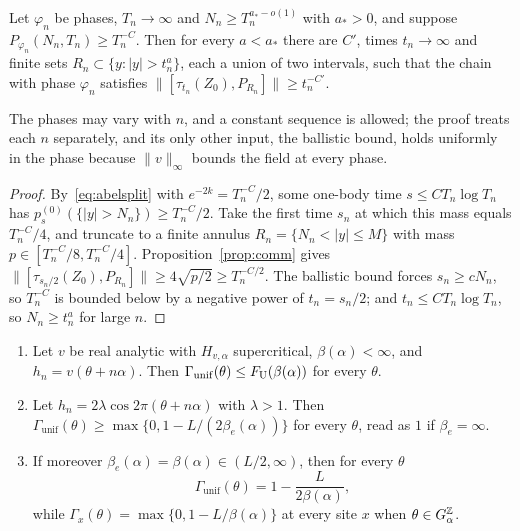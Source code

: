\begin{lemma}\label{lem:tailcomm}
Let $\varphi_n$ be phases, $T_n\to\infty$ and $N_n\ge T_n^{a_*-o(1)}$ with $a_*>0$, and suppose $P_{\varphi_n}(N_n,T_n)\ge T_n^{-C}$. Then for every $a<a_*$ there are $C'$, times $t_n\to\infty$ and finite sets $R_n\subset\{y:|y|>t_n^a\}$, each a union of two intervals, such that the chain with phase $\varphi_n$ satisfies $\|[\tau_{t_n}(Z_0),P_{R_n}]\|\ge t_n^{-C'}$.
\end{lemma}

The phases may vary with $n$, and a constant sequence is allowed; the proof treats each $n$ separately, and its only other input, the ballistic bound, holds uniformly in the phase because $\|v\|_\infty$ bounds the field at every phase.

\begin{proof}
By~\eqref{eq:abelsplit} with $e^{-2k}=T_n^{-C}/2$, some one-body time $s\le CT_n\log T_n$ has $p^{(0)}_s(\{|y|>N_n\})\ge T_n^{-C}/2$. Take the first time $s_n$ at which this mass equals $T_n^{-C}/4$, and truncate to a finite annulus $R_n=\{N_n<|y|\le M\}$ with mass $p\in[T_n^{-C}/8,T_n^{-C}/4]$. Proposition~\ref{prop:comm} gives $\|[\tau_{s_n/2}(Z_0),P_{R_n}]\|\ge4\sqrt{p/2}\ge T_n^{-C/2}$. The ballistic bound forces $s_n\ge cN_n$, so $T_n^{-C}$ is bounded below by a negative power of $t_n=s_n/2$; and $t_n\le CT_n\log T_n$, so $N_n\ge t_n^a$ for large $n$.
\end{proof}

\begin{theorem}\label{thm:LRunif}
\begin{enumerate}
\item Let $v$ be real analytic with $H_{v,\alpha}$ supercritical, $\beta(\alpha)<\infty$, and $h_n=v(\theta+n\alpha)$. Then $\Gamma_{\mathrm{unif}}(\theta)\le F_{\mathrm U}(\beta(\alpha))$ for every $\theta$.
\item Let $h_n=2\lambda\cos2\pi(\theta+n\alpha)$ with $\lambda>1$. Then $\Gamma_{\mathrm{unif}}(\theta)\ge\max\{0,1-L/(2\beta_e(\alpha))\}$ for every $\theta$, read as $1$ if $\beta_e=\infty$.
\item If moreover $\beta_e(\alpha)=\beta(\alpha)\in(L/2,\infty)$, then for every $\theta$
\[
\Gamma_{\mathrm{unif}}(\theta)=1-\frac L{2\beta(\alpha)},
\]
while $\Gamma_x(\theta)=\max\{0,1-L/\beta(\alpha)\}$ at every site $x$ when $\theta\in G_\alpha^\mathbb Z$.
\end{enumerate}
\end{theorem}

